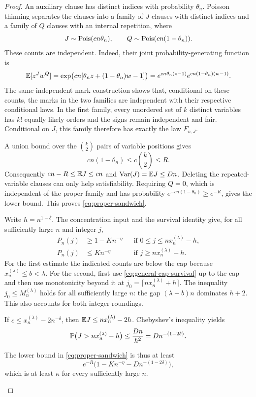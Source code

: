 \begin{proof}
An auxiliary clause has distinct indices with probability \(\theta_n\).
Poisson thinning separates the clauses into a family of \(J\) clauses
with distinct indices and a family of \(Q\) clauses with an internal
repetition, where
\[
 J\sim\operatorname{Pois}(cn\theta_n),\qquad Q\sim\operatorname{Pois}(cn(1-\theta_n)).
\]
These counts are independent.  Indeed, their joint probability-generating
function is
\[
 \mathbb E[z^Jw^Q]
 =\exp\bigl(cn[\theta_n z+(1-\theta_n)w-1]\bigr)
 =e^{cn\theta_n(z-1)}e^{cn(1-\theta_n)(w-1)}.
\]
The same independent-mark construction shows that, conditional on these
counts, the marks in the two families are independent with their
respective conditional laws.  In the first family, every unordered set
of \(k\) distinct variables has \(k!\) equally likely orders and the
signs remain independent and fair.  Conditional on \(J\), this family
therefore has exactly the law \(F_{n,J}\).

A union bound over the \(\binom{k}{2}\) pairs of variable positions gives
\[
 cn(1-\theta_n)\le c\binom{k}{2}\le R.
\]
Consequently \(cn-R\le\mathbb E J\le cn\) and \(\operatorname{Var}(J)=\mathbb E J\le Dn\).
Deleting the repeated-variable clauses can only help satisfiability.
Requiring \(Q=0\), which is independent of the proper family and has
probability \(e^{-cn(1-\theta_n)}\ge e^{-R}\), gives the lower bound.
This proves \eqref{eq:proper-sandwich}.

Write \(h=n^{1-\delta}\).  The concentration input and the survival
identity give, for all sufficiently large \(n\) and integer \(j\),
\begin{align*}
 P_n(j)&\ge1-Kn^{-\eta}
 &&\text{if }0\le j\le nx_n^{(\lambda)}-h,\\
 P_n(j)&\le Kn^{-\eta}
 &&\text{if }j\ge nx_n^{(\lambda)}+h.
\end{align*}
For the first estimate the indicated counts are below the cap because
\(x_n^{(\lambda)}\le b<\lambda\).  For the second, first use
\eqref{eq:general-cap-survival} up to the cap and then use monotonicity
beyond it at \(j_0=\lceil nx_n^{(\lambda)}+h\rceil\).
The inequality \(j_0\le M_n^{(\lambda)}\) holds for all sufficiently
large \(n\): the gap \((\lambda-b)n\) dominates \(h+2\).  This also
accounts for both integer roundings.

If \(c\le x_n^{(\lambda)}-2n^{-\delta}\), then
\(\mathbb E J\le nx_n^{(\lambda)}-2h\).  Chebyshev's inequality yields
\[
 \mathbb P\bigl(J>nx_n^{(\lambda)}-h\bigr)
 \le\frac{Dn}{h^2}=D n^{-(1-2\delta)}.
\]
\begin{samepage}
The lower bound in \eqref{eq:proper-sandwich} is thus at least
\[
 e^{-R}\bigl(1-Kn^{-\eta}-D n^{-(1-2\delta)}\bigr),
\]
which is at least \(\kappa\) for every sufficiently large \(n\).
\end{samepage}


\end{proof}
